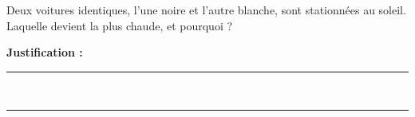 Deux voitures identiques, l'une noire et l'autre blanche, sont stationnées au soleil. Laquelle devient la plus chaude, et pourquoi ?

\choices

\noindent\textbf{Justification :} \hrulefill \\[2.5ex]
\rule{\linewidth}{0.4pt} \\[2.5ex]
\rule{\linewidth}{0.4pt}
\vfill
